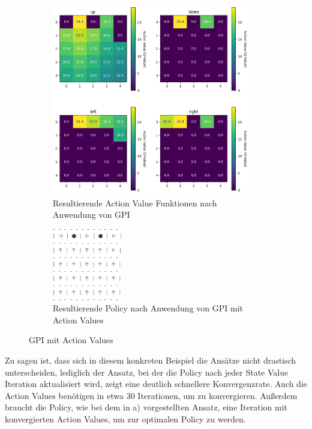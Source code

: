 \documentclass[11pt]{article}
\begin{document}
\begin{figure}[t]
    \begin{subfigure}[t]{\textwidth}
        \centering
        \includegraphics[width=0.95\textwidth]{img/3_1_c.png}
        \caption{Resultierende Action Value Funktionen nach Anwendung von GPI}
        \label{img:3_1_c_heatmap}
    \end{subfigure}
    \begin{subfigure}[t]{\textwidth}
        \centering
        \includegraphics[width=0.33\textwidth]{img/3_1_c2.png}
        \caption{Resultierende Policy nach Anwendung von GPI mit Action Values}
        \label{img:3_1_c_policy}
    \end{subfigure}
    \caption{GPI mit Action Values}
    \label{img:3_1_c}
\end{figure}%
Zu sagen ist, dass sich in diesem konkreten Beispiel die Ansätze nicht drastisch unterscheiden, lediglich der Ansatz, bei der die Policy nach jeder State Value Iteration aktualisiert wird, zeigt eine deutlich schnellere Konvergenzrate. Auch die Action Values benötigen in etwa $30$ Iterationen, um zu konvergieren. Außerdem braucht die Policy, wie bei dem in a) vorgestellten Ansatz, eine Iteration mit konvergierten Action Values, um zur optimalen Policy zu werden.\\
\end{document}
